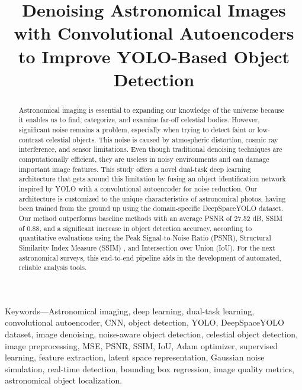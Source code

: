 \documentclass[12pt, conference]{IEEEtran}
\title{Denoising Astronomical Images with Convolutional Autoencoders to Improve YOLO-Based Object Detection}
\author{
    \IEEEauthorblockN{Adrika Pradhan}
    \IEEEauthorblockA{
        B.Tech Computer Science (Artificial Intelligence \& Machine Learning) \\
        University of Petroleum and Energy Studies\\
        adrika2607@gmail.com
    }
}
\begin{document}
\maketitle

\begin{abstract}
Astronomical imaging is essential to expanding our knowledge of the universe because it enables us to find, categorize, and examine far-off celestial bodies. However, significant noise remains a problem, especially when trying to detect faint or low-contrast celestial objects. This noise is caused by atmospheric distortion, cosmic ray interference, and sensor limitations. Even though traditional denoising techniques are computationally efficient, they are useless in noisy environments and can damage important image features. This study offers a novel dual-task deep learning architecture that gets around this limitation by fusing an object identification network inspired by YOLO \cite{redmon2016you} with a convolutional autoencoder for noise reduction.
Our architecture is customized to the unique characteristics of astronomical photos, having been trained from the ground up using the domain-specific DeepSpaceYOLO \cite{deepspaceyolo} dataset. Our method outperforms baseline methods with an average PSNR of 27.52 dB, SSIM \cite{wang2004image} of 0.88, and a significant increase in object detection accuracy, according to quantitative evaluations using the Peak Signal-to-Noise Ratio (PSNR), Structural Similarity Index Measure (SSIM) \cite{wang2004image}, and Intersection over Union (IoU). For the next astronomical surveys, this end-to-end pipeline aids in the development of automated, reliable analysis tools.
\end{abstract}

\begin{IEEEkeywords}
Keywords—Astronomical imaging, deep learning, dual-task learning, convolutional autoencoder, CNN, object detection, YOLO, DeepSpaceYOLO dataset, image denoising, noise-aware object detection, celestial object detection, image preprocessing, MSE, PSNR, SSIM, IoU, Adam optimizer, supervised learning, feature extraction, latent space representation, Gaussian noise simulation, real-time detection, bounding box regression, image quality metrics, astronomical object localization. 
\end{IEEEkeywords}
\end{document}
